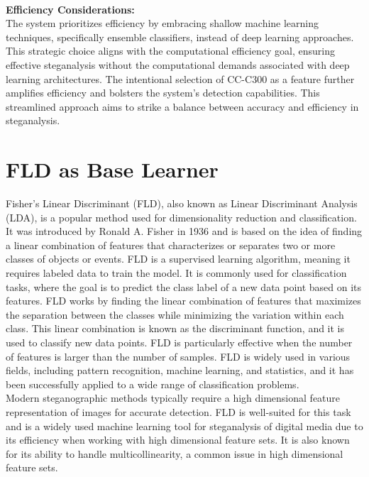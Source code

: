 \vspace{0.25cm}\\
\textbf{Efficiency Considerations:}\\
The system prioritizes efficiency by embracing shallow machine learning techniques, specifically ensemble classifiers, instead of deep learning approaches. This strategic choice aligns with the computational efficiency goal, ensuring effective steganalysis without the computational demands associated with deep learning architectures. The intentional selection of CC-C300 as a feature further amplifies efficiency and bolsters the system's detection capabilities. This streamlined approach aims to strike a balance between accuracy and efficiency in steganalysis.\\
\clearpage
\section{FLD as Base Learner}
Fisher's Linear Discriminant (FLD), also known as Linear Discriminant Analysis (LDA), is a popular method used for dimensionality reduction and classification. It was introduced by Ronald A. Fisher in 1936 and is based on the idea of finding a linear combination of features that characterizes or separates two or more classes of objects or events. FLD is a supervised learning algorithm, meaning it requires labeled data to train the model. It is commonly used for classification tasks, where the goal is to predict the class label of a new data point based on its features. FLD works by finding the linear combination of features that maximizes the separation between the classes while minimizing the variation within each class. This linear combination is known as the discriminant function, and it is used to classify new data points. FLD is particularly effective when the number of features is larger than the number of samples. FLD is widely used in various fields, including pattern recognition, machine learning, and statistics, and it has been successfully applied to a wide range of classification problems.
\\
Modern steganographic methods typically require a high dimensional feature representation of images for accurate detection. FLD is well-suited for this task and is a widely used machine learning tool for steganalysis of digital media due to its efficiency when working with high dimensional feature sets. It is also known for its ability to handle multicollinearity, a common issue in high dimensional feature sets.\cite{23}\\

